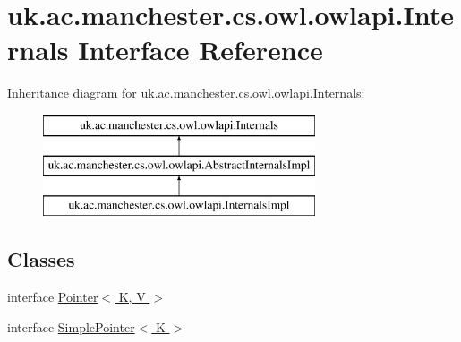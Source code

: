 \hypertarget{interfaceuk_1_1ac_1_1manchester_1_1cs_1_1owl_1_1owlapi_1_1_internals}{\section{uk.\-ac.\-manchester.\-cs.\-owl.\-owlapi.\-Internals Interface Reference}
\label{interfaceuk_1_1ac_1_1manchester_1_1cs_1_1owl_1_1owlapi_1_1_internals}
}
Inheritance diagram for uk.\-ac.\-manchester.\-cs.\-owl.\-owlapi.\-Internals\-:\begin{figure}[H]
\begin{center}
\leavevmode
\includegraphics[height=3.000000cm]{interfaceuk_1_1ac_1_1manchester_1_1cs_1_1owl_1_1owlapi_1_1_internals}
\end{center}
\end{figure}
\subsection*{Classes}
\begin{DoxyCompactItemize}
\item 
interface \hyperlink{interfaceuk_1_1ac_1_1manchester_1_1cs_1_1owl_1_1owlapi_1_1_internals_1_1_pointer_3_01_k_00_01_v_01_4}{Pointer$<$ K, V $>$}
\item 
interface \hyperlink{interfaceuk_1_1ac_1_1manchester_1_1cs_1_1owl_1_1owlapi_1_1_internals_1_1_simple_pointer_3_01_k_01_4}{Simple\-Pointer$<$ K $>$}
\end{DoxyCompactItemize}
